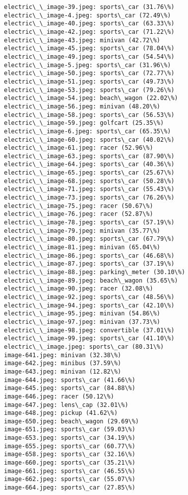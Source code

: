 \documentclass[11pt]{article}
\begin{document}
\begin{Verbatim}[commandchars=\\\{\}]
electric\_\_image-39.jpeg: sports\_car (31.76\%)
electric\_\_image-4.jpeg: sports\_car (72.49\%)
electric\_\_image-40.jpeg: sports\_car (63.33\%)
electric\_\_image-42.jpeg: sports\_car (71.22\%)
electric\_\_image-43.jpeg: minivan (42.72\%)
electric\_\_image-45.jpeg: sports\_car (78.04\%)
electric\_\_image-49.jpeg: sports\_car (54.54\%)
electric\_\_image-5.jpeg: sports\_car (31.96\%)
electric\_\_image-50.jpeg: sports\_car (72.77\%)
electric\_\_image-51.jpeg: sports\_car (49.73\%)
electric\_\_image-53.jpeg: sports\_car (79.26\%)
electric\_\_image-54.jpeg: beach\_wagon (22.02\%)
electric\_\_image-56.jpeg: minivan (48.20\%)
electric\_\_image-58.jpeg: sports\_car (56.53\%)
electric\_\_image-59.jpeg: golfcart (25.35\%)
electric\_\_image-6.jpeg: sports\_car (65.35\%)
electric\_\_image-60.jpeg: sports\_car (40.02\%)
electric\_\_image-61.jpeg: racer (52.96\%)
electric\_\_image-63.jpeg: sports\_car (87.90\%)
electric\_\_image-64.jpeg: sports\_car (40.36\%)
electric\_\_image-65.jpeg: sports\_car (25.67\%)
electric\_\_image-68.jpeg: sports\_car (50.28\%)
electric\_\_image-71.jpeg: sports\_car (55.43\%)
electric\_\_image-73.jpeg: sports\_car (76.26\%)
electric\_\_image-75.jpeg: racer (50.67\%)
electric\_\_image-76.jpeg: racer (52.87\%)
electric\_\_image-78.jpeg: sports\_car (57.19\%)
electric\_\_image-79.jpeg: minivan (35.77\%)
electric\_\_image-80.jpeg: sports\_car (67.79\%)
electric\_\_image-81.jpeg: minivan (65.04\%)
electric\_\_image-86.jpeg: sports\_car (46.68\%)
electric\_\_image-87.jpeg: sports\_car (37.19\%)
electric\_\_image-88.jpeg: parking\_meter (30.10\%)
electric\_\_image-89.jpeg: beach\_wagon (35.65\%)
electric\_\_image-90.jpeg: racer (32.08\%)
electric\_\_image-92.jpeg: sports\_car (48.56\%)
electric\_\_image-94.jpeg: sports\_car (42.10\%)
electric\_\_image-95.jpeg: minivan (54.86\%)
electric\_\_image-97.jpeg: minivan (37.73\%)
electric\_\_image-98.jpeg: convertible (37.01\%)
electric\_\_image-99.jpeg: sports\_car (41.10\%)
electric\_\_image.jpeg: sports\_car (80.31\%)
image-641.jpeg: minivan (32.38\%)
image-642.jpeg: minibus (37.59\%)
image-643.jpeg: minivan (12.82\%)
image-644.jpeg: sports\_car (41.66\%)
image-645.jpeg: sports\_car (84.88\%)
image-646.jpeg: racer (50.12\%)
image-647.jpeg: lens\_cap (32.01\%)
image-648.jpeg: pickup (41.62\%)
image-650.jpeg: beach\_wagon (29.69\%)
image-651.jpeg: sports\_car (59.03\%)
image-653.jpeg: sports\_car (34.19\%)
image-655.jpeg: sports\_car (60.77\%)
image-658.jpeg: sports\_car (32.16\%)
image-660.jpeg: sports\_car (35.21\%)
image-661.jpeg: sports\_car (46.55\%)
image-662.jpeg: sports\_car (55.07\%)
image-664.jpeg: sports\_car (27.85\%)

\end{Verbatim}
\end{document}
